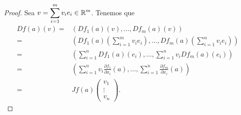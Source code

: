 \begin{proof}
Sea $\displaystyle v = \sum^{m}_{i = 1}v_{i}e_{i}\in \mathbb{R}^{m} $. Tenemos que 
\[
\begin{split}
	Df\left(a\right)\left(v\right) = & \left(Df_{1}\left(a\right)\left(v\right), \ldots, Df_{m}\left(a\right)\left(v\right)\right) \\
	= & \left(Df_{1}\left(a\right)\left(\sum^{m}_{i = 1}v_{i}e_{i}\right), \ldots, Df_{m}\left(a\right)\left(\sum^{n}_{i = 1}v_{i}e_{i}\right)\right) \\
	= & \left(\sum^{n}_{i = 1}Df_{1}\left(a\right)\left(e_{i}\right), \ldots, \sum^{n}_{i = 1}v_{i}Df_{m}\left(a\right)\left(e_{i}\right)\right) \\
	= & \left(\sum^{n}_{i = 1}v_{i}\frac{\partial f_{1}}{\partial x_{i}}\left(a\right), \ldots, \sum^{n}_{ i= 1}\frac{\partial f_{m}}{\partial x_{i}}\left(a\right)\right) \\
	= & Jf\left(a\right) \begin{pmatrix} v_{1} \\ \vdots \\ v_{n} \end{pmatrix}.
\end{split}
\]
\end{proof}

